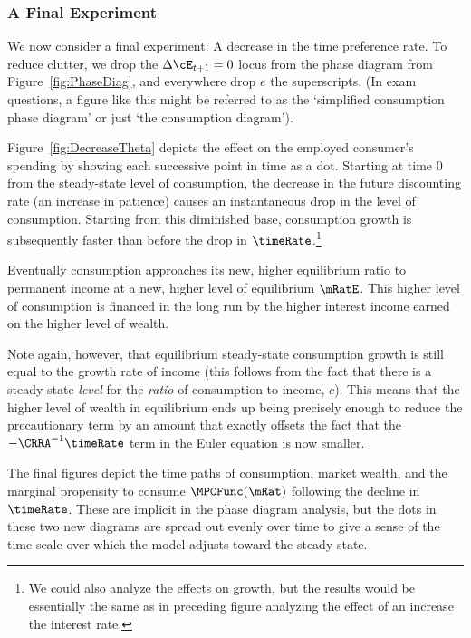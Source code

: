 \documentclass{\handout}
\begin{document}
\subsubsection{A Final Experiment}
We now consider a final experiment: A decrease in the time preference
rate.  To reduce clutter, we drop the $\Delta \cE_{t+1}=0$ locus from the 
phase diagram from Figure~\ref{fig:PhaseDiag}, and everywhere drop $e$ the superscripts.  
(In exam questions, a figure like this might be referred to as the `simplified consumption phase diagram' or just
`the consumption diagram').

Figure~\ref{fig:DecreaseTheta} depicts the effect on the 
employed consumer's spending by
showing each successive point in time as a dot.  
Starting at time 0 from the steady-state level of consumption, the
decrease in the future discounting rate (an increase in patience) causes
an instantaneous drop in the level of consumption.  Starting from this diminished 
base, consumption growth is subsequently faster than before the drop in $\timeRate$.\footnote{We could also analyze the effects on growth, but the
  results would be essentially the same as in preceding figure
  analyzing the effect of an increase the interest rate.}

Eventually consumption approaches its new, higher equilibrium ratio
to permanent income at a new, higher level of equilibrium $\mRatE$.  This
higher level of consumption is financed in the long run by the higher
interest income earned on the higher level of wealth.

Note again, however, that equilibrium steady-state 
consumption growth is still equal to the growth rate of income (this follows
from the fact that there is a steady-state {\it level} for the {\it
  ratio} of consumption to income, $c$).  This means that the higher
level of wealth in equilibrium ends up being precisely enough to
reduce the precautionary term by an amount that exactly offsets the
fact that the $-\CRRA^{-1}\timeRate$ term in the Euler equation is now
smaller.

The final figures depict the time paths of consumption, market wealth,
and the marginal propensity to consume $\MPCFunc(\mRat)$ following the
decline in $\timeRate$.  These are implicit in the phase diagram
analysis, but the dots in these two new diagrams are spread out evenly
over time to give a sense of the time scale over which the model
adjusts toward the steady state.
\end{document}
